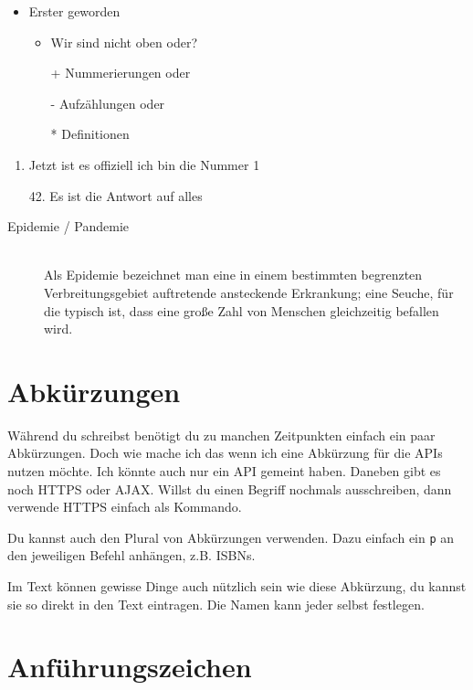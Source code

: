 \begin{itemize}
	\item Erster geworden
	\begin{itemize}
		\item Wir sind nicht oben oder?
		\item[+] Nummerierungen oder
		\item[-] Aufzählungen oder
		\item[*] Definitionen 
	\end{itemize}
\end{itemize}

\begin{enumerate}
	\item Jetzt ist es offiziell ich bin die Nummer 1
	\item[42.] Es ist die Antwort auf alles
\end{enumerate}

\begin{description}
	\item[Epidemie / Pandemie] \hfill \\
	Als Epidemie bezeichnet man eine in einem bestimmten begrenzten Verbreitungsgebiet auftretende ansteckende Erkrankung; eine Seuche, für die typisch ist, dass eine große Zahl von Menschen gleichzeitig befallen wird.
\end{description}


\section{Abkürzungen}
Während du schreibst benötigt du zu manchen Zeitpunkten einfach ein paar Abkürzungen. Doch wie mache ich das wenn ich eine Abkürzung für die \acp{API} nutzen möchte. Ich könnte auch nur ein \ac{API} gemeint haben. Daneben gibt es noch \ac{HTTPS} oder \ac{AJAX}. Willst du einen Begriff nochmals ausschreiben, dann verwende \acf{HTTPS} einfach als Kommando.

Du kannst auch den Plural von Abkürzungen verwenden. Dazu einfach ein \texttt{p} an den jeweiligen Befehl anhängen, z.B. 
\acfp{ISBN}.

Im Text können gewisse Dinge auch nützlich sein wie \zB diese Abkürzung, \dash du kannst sie so direkt in den Text eintragen. Die Namen kann jeder selbst festlegen.


\section{Anführungszeichen}

